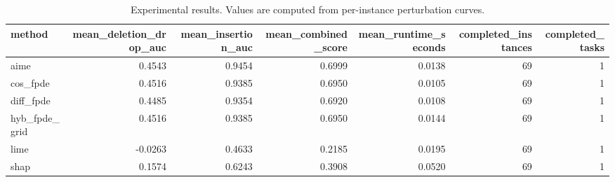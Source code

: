 \begin{table}[t]
\caption{Experimental results. Values are computed from per-instance perturbation curves.}
\label{tab:main_results_computed}
\centering
\begin{tabular}{lrrrrrr}
\toprule
method & mean\_deletion\_drop\_auc & mean\_insertion\_auc & mean\_combined\_score & mean\_runtime\_seconds & completed\_instances & completed\_tasks \\
\midrule
aime & 0.4543 & 0.9454 & 0.6999 & 0.0138 & 69 & 1 \\
cos\_fpde & 0.4516 & 0.9385 & 0.6950 & 0.0105 & 69 & 1 \\
diff\_fpde & 0.4485 & 0.9354 & 0.6920 & 0.0108 & 69 & 1 \\
hyb\_fpde\_grid & 0.4516 & 0.9385 & 0.6950 & 0.0144 & 69 & 1 \\
lime & -0.0263 & 0.4633 & 0.2185 & 0.0195 & 69 & 1 \\
shap & 0.1574 & 0.6243 & 0.3908 & 0.0520 & 69 & 1 \\
\bottomrule
\end{tabular}

\end{table}
